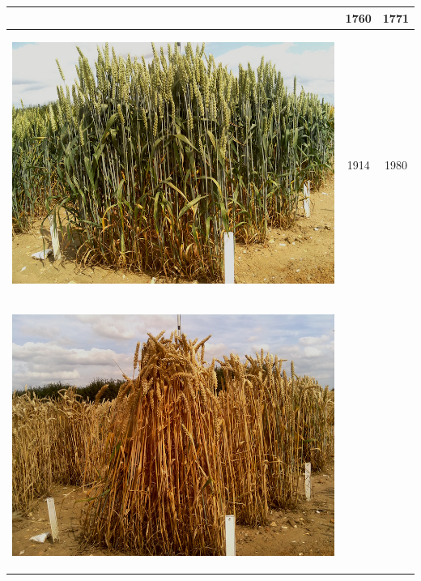 \begin{table}[hp!]
\begin{tabular}{ | c | c | c | }
\begin{minipage}{.3\textwidth}
\begin{center}
      \end{center}
    \end{minipage}
    &
      1760
    & 
      1771
    \\ \hline
    \begin{minipage}{.3\textwidth}
      \begin{center}
		\includegraphics[width=\linewidth]{Images/003}
      \end{center}
    \end{minipage}
    &
      1914
    & 
      1980
    \\ \hline
    \begin{minipage}{.3\textwidth}
      \begin{center}
		\includegraphics[width=\linewidth]{Images/004}

\end{center}
\end{minipage}
\end{tabular}
\end{table}
